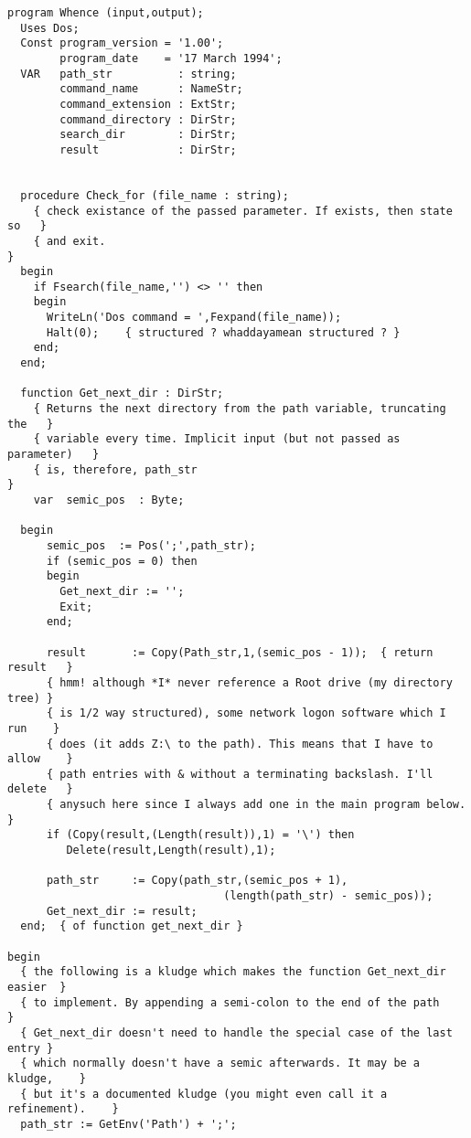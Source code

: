 \begin{verbatim}
program Whence (input,output);
  Uses Dos; 
  Const program_version = '1.00';
        program_date    = '17 March 1994';
  VAR   path_str          : string;
        command_name      : NameStr;
        command_extension : ExtStr;
        command_directory : DirStr;
        search_dir        : DirStr;
        result            : DirStr;


  procedure Check_for (file_name : string);
    { check existance of the passed parameter. If exists, then state so   }
    { and exit.                                                           }
  begin
    if Fsearch(file_name,'') <> '' then
    begin
      WriteLn('Dos command = ',Fexpand(file_name));
      Halt(0);    { structured ? whaddayamean structured ? }
    end;
  end;

  function Get_next_dir : DirStr;
    { Returns the next directory from the path variable, truncating the   }
    { variable every time. Implicit input (but not passed as parameter)   }
    { is, therefore, path_str                                             }
    var  semic_pos  : Byte;

  begin
      semic_pos  := Pos(';',path_str);
      if (semic_pos = 0) then
      begin
        Get_next_dir := '';
        Exit;
      end;

      result       := Copy(Path_str,1,(semic_pos - 1));  { return result   }
      { hmm! although *I* never reference a Root drive (my directory tree) }
      { is 1/2 way structured), some network logon software which I run    }
      { does (it adds Z:\ to the path). This means that I have to allow    }
      { path entries with & without a terminating backslash. I'll delete   }
      { anysuch here since I always add one in the main program below.     }
      if (Copy(result,(Length(result)),1) = '\') then
         Delete(result,Length(result),1);

      path_str     := Copy(path_str,(semic_pos + 1),
                                 (length(path_str) - semic_pos));
      Get_next_dir := result;
  end;  { of function get_next_dir }

begin
  { the following is a kludge which makes the function Get_next_dir easier  }
  { to implement. By appending a semi-colon to the end of the path         }
  { Get_next_dir doesn't need to handle the special case of the last entry }
  { which normally doesn't have a semic afterwards. It may be a kludge,    }
  { but it's a documented kludge (you might even call it a refinement).    }
  path_str := GetEnv('Path') + ';';


\end{verbatim}
